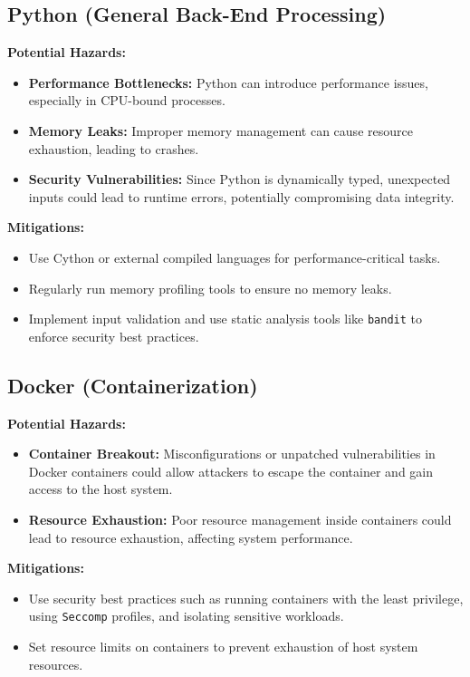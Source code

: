 \documentclass{article}
\begin{document}
\subsection{Python (General Back-End Processing)}
\textbf{Potential Hazards:}
\begin{itemize}
    \item \textbf{Performance Bottlenecks:} Python can introduce performance issues, especially in CPU-bound processes.
    \item \textbf{Memory Leaks:} Improper memory management can cause resource exhaustion, leading to crashes.
    \item \textbf{Security Vulnerabilities:} Since Python is dynamically typed, unexpected inputs could lead to runtime errors, potentially compromising data integrity.
\end{itemize}
\textbf{Mitigations:}
\begin{itemize}
    \item Use Cython or external compiled languages for performance-critical tasks.
    \item Regularly run memory profiling tools to ensure no memory leaks.
    \item Implement input validation and use static analysis tools like \texttt{bandit} to enforce security best practices.
\end{itemize}

\subsection{Docker (Containerization)}
\textbf{Potential Hazards:}
\begin{itemize}
    \item \textbf{Container Breakout:} Misconfigurations or unpatched vulnerabilities in Docker containers could allow attackers to escape the container and gain access to the host system.
    \item \textbf{Resource Exhaustion:} Poor resource management inside containers could lead to resource exhaustion, affecting system performance.
\end{itemize}
\textbf{Mitigations:}
\begin{itemize}
    \item Use security best practices such as running containers with the least privilege, using \texttt{Seccomp} profiles, and isolating sensitive workloads.
    \item Set resource limits on containers to prevent exhaustion of host system resources.
\end{itemize}
\end{document}
